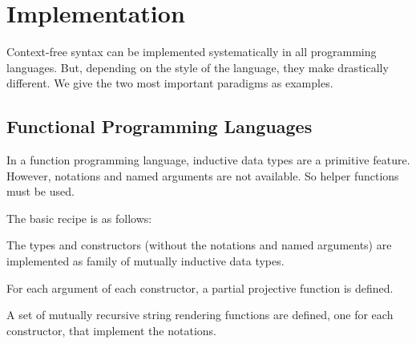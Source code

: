 \section{Implementation}

Context-free syntax can be implemented systematically in all programming languages.
But, depending on the style of the language, they make drastically different.
We give the two most important paradigms as examples.

\subsection{Functional Programming Languages}

In a function programming language, inductive data types are a primitive feature.
However, notations and named arguments are not available.
So helper functions must be used.

The basic recipe is as follows:
\begin{compactitem}
\item The types and constructors (without the notations and named arguments) are implemented as family of mutually inductive data types.
\item For each argument of each constructor, a partial projective function is defined.
\item A set of mutually recursive string rendering functions are defined, one for each constructor, that implement the notations.
\end{compactitem}

